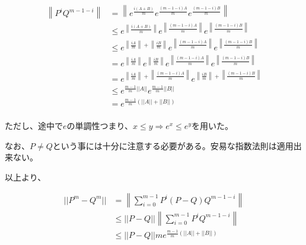 \documentclass[a4paper, 10pt, dvipdfmx]{jlreq}
\begin{document}
\begin{align*}
  \left\lVert P^iQ^{m-1-i}\right\rVert & = \left\lVert e^{\frac{i(A+B)}{m}}e^{\frac{(m-1-i)A}{m}}e^{\frac{(m-1-i)B}{m}} \right\rVert                                                                                \\
                                       & \leq e^{\left\lVert\frac{i(A+B)}{m}\right\rVert}e^{\left\lVert\frac{(m-1-i)A}{m}\right\rVert}e^{\left\lVert\frac{(m-1-i)B}{m}\right\rVert}                                 \\
                                       & \leq e^{\left\lVert\frac{iA}{m}\right\rVert+\left\lVert\frac{iB}{m}\right\rVert}e^{\left\lVert\frac{(m-1-i)A}{m}\right\rVert}e^{\left\lVert\frac{(m-1-i)B}{m}\right\rVert} \\
                                       & = e^{\left\lVert\frac{iA}{m}\right\rVert}e^{\left\lVert\frac{iB}{m}\right\rVert}e^{\left\lVert\frac{(m-1-i)A}{m}\right\rVert}e^{\left\lVert\frac{(m-1-i)B}{m}\right\rVert} \\
                                       & = e^{\left\lVert\frac{iA}{m}\right\rVert+\left\lVert\frac{(m-1-i)A}{m}\right\rVert}e^{\left\lVert\frac{iB}{m}\right\rVert+\left\lVert\frac{(m-1-i)B}{m}\right\rVert}       \\
                                       & \leq e^{\frac{m-1}{m}||A||}e^{\frac{m-1}{m}||B||}                                                                                                                          \\
                                       & = e^{\frac{m-1}{m}(||A||+||B||)}                                                                                                                                           \\
\end{align*}

ただし、途中で$e$の単調性つまり、$x \leq y\Rightarrow e^x \leq e^y$を用いた。

なお、$P \neq Q$という事には十分に注意する必要がある。安易な指数法則は適用出来ない。

以上より、

\begin{align*}
  ||P^m-Q^m|| & =\left\lVert \sum_{i=0}^{m-1}P^i(P-Q)Q^{m-1-i}\right\rVert       \\
              & \leq ||P-Q||\left\lVert \sum_{i=0}^{m-1}P^iQ^{m-1-i}\right\rVert \\
              & \leq ||P-Q||m e^{\frac{m-1}{m}(||A||+||B||)}
\end{align*}
\end{document}
